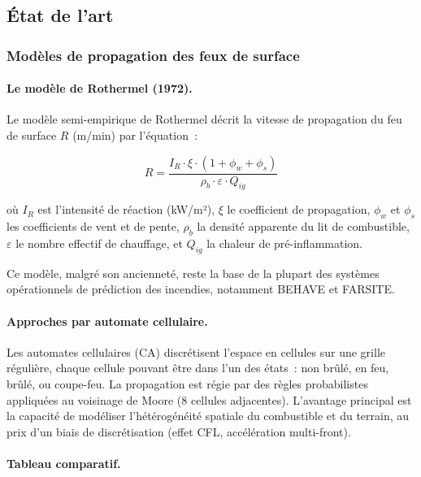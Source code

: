 \documentclass[a4paper,12pt,openany,titlepage]{scrartcl}
\begin{document}
\subsection{État de l'art}

\subsubsection{Modèles de propagation des feux de surface}

\paragraph{Le modèle de Rothermel (1972).} Le modèle semi-empirique de Rothermel décrit la vitesse de propagation du feu de surface $R$ (m/min) par l'équation~:

\begin{equation}
R = \frac{I_R \cdot \xi \cdot (1 + \phi_w + \phi_s)}{\rho_b \cdot \varepsilon \cdot Q_{ig}}
\label{eq:rothermel}
\end{equation}

où $I_R$ est l'intensité de réaction (kW/m²), $\xi$ le coefficient de propagation, $\phi_w$ et $\phi_s$ les coefficients de vent et de pente, $\rho_b$ la densité apparente du lit de combustible, $\varepsilon$ le nombre effectif de chauffage, et $Q_{ig}$ la chaleur de pré-inflammation.

Ce modèle, malgré son ancienneté, reste la base de la plupart des systèmes opérationnels de prédiction des incendies, notamment BEHAVE et FARSITE.

\paragraph{Approches par automate cellulaire.} Les automates cellulaires (CA) discrétisent l'espace en cellules sur une grille régulière, chaque cellule pouvant être dans l'un des états~: non brûlé, en feu, brûlé, ou coupe-feu. La propagation est régie par des règles probabilistes appliquées au voisinage de Moore (8 cellules adjacentes). L'avantage principal est la capacité de modéliser l'hétérogénéité spatiale du combustible et du terrain, au prix d'un biais de discrétisation (effet CFL, accélération multi-front).

\paragraph{Tableau comparatif.}
\end{document}
